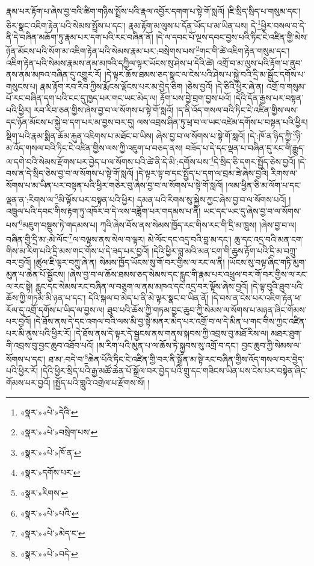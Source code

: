 རྣམ་པར་རྟོག་པ་ཞེས་བྱ་བའི་ཚིག་གཉིས་སྤྲོས་པའི་རྣལ་འབྱོར་དགག་པ་སྟེ་གོ་སླའོ། །ཇི་སྲིད་སྲིད་པ་གསུམ་དང་། ཅིར་སྣང་འཇིག་རྟེན་པའི་སེམས་སྤྲོས་པ་དང་། རྣམ་རྟོག་མ་ལུས་པ་དོན་ཡོད་པ་མ་ཡིན་པས། དེ་\footnote{«སྣར་»«པེ་»དེའི་}ཕྱིར་བསལ་བ་དེ་ནི་དེ་བཞིན་མཆོག་ཏུ་རྣམ་པར་དག་པའི་རང་བཞིན་ནོ། །དེ་ལ་དབང་པོ་ལྔས་དབང་བྱས་པའི་ཏིང་ངེ་འཛིན་གྱི་མེས་ཉོན་མོངས་པའི་སོག་མ་འཇིག་རྟེན་པའི་སེམས་རྣམ་པར་:བསྲེགས་པས་\footnote{«སྣར་»«པེ་»བསྲེག་པས་}གང་གི་ཚེ་འཇིག་རྟེན་གསུམ་དང་། འཇིག་རྟེན་པའི་སེམས་རྣམས་ནམ་མཁའི་དཀྱིལ་ལྟར་ཡོངས་སུ་ཤེས་པ་དེའི་ཚེ། འགྲོ་བ་མ་ལུས་པའི་རྟོག་པ་ནུབ་ནས་ནམ་མཁའ་བཞིན་དུ་འགྱུར་རོ། །དེ་ལྟར་ཆོས་ཐམས་ཅད་སྣང་ལ་ངེས་པའི་ཤེས་པ་སྐྱེ་བའི་དྲི་མ་སྦྱོང་དགོས་པ་གསུངས་པ། རྣམ་རྟོག་རབ་རིབ་ཀྱིས་རྨོངས་ལྡོངས་པར་མ་བྱེད་ཅིག །ཅེས་བྱའོ། །དེ་ཅིའི་ཕྱིར་ཞེ་ན། འགྲོ་བ་གསུམ་པོ་རང་བཞིན་དག་པའི་ངང་དུ་ཁྱད་པར་གང་ཡང་མེད་ལ། རྟོག་པས་བྱེ་བྲག་བྱས་པའོ། །དེའི་དོན་རྒྱས་པར་བསྟན་པའི་ཕྱིར། རབ་རིབ་ཅན་གྱིས་ཞེས་བྱ་བ་ལ་སོགས་པ་སྟེ་གོ་སླའོ། །ད་ནི་འོད་གསལ་བའི་ཏིང་ངེ་འཛིན་གྱིས་ལས་དང་ཉོན་མོངས་པ་སྐྱེ་བ་དག་པར་མ་བྱས་བར་དུ། ལས་འབྲས་ཤིན་ཏུ་ཕྲ་བ་ལ་ཡང་འཛེམ་དགོས་པ་བསྟན་པའི་ཕྱིར། སྡིག་པའི་རྣམ་སྨིན་ཆོམ་རྐུན་འཇིགས་པ་མཐོང་བ་ཡིས། ཞེས་བྱ་བ་ལ་སོགས་པ་སྟེ་གོ་སླའོ། །དེ་:ཁོ་ན་ཉིད་ཀྱི་\footnote{«སྣར་»«པེ་»ཁོ་ན་}ཉི་མ་འོད་གསལ་བའི་ཏིང་ངེ་འཛིན་གྱིས་ལས་ཀྱི་འཇུག་པ་བཅད་ནས། བཟོད་པ་དེ་དང་ལྡན་པ་བཞིན་དུ་རང་གི་རྒྱུད་ལ་དགེ་བའི་སེམས་རྫོགས་པར་བྱེད་པ་ལ་སོགས་པའི་ཚེ་ནི་དེ་མི་:དགོས་པས་\footnote{«སྣར་»དགོས་པར་}དེ་སྲིད་ཅི་དགར་སྤྱོད་ཅེས་བྱའོ། །དེ་བས་ན་དེ་སྲིད་ཅེས་བྱ་བ་ལ་སོགས་པ་སྟེ་གོ་སླའོ། །དེ་ལྟར་ལྟ་བ་དང་སྤྱོད་པ་དག་ལ་བྲམ་ཟེ་ཞེས་བྱའི། རིགས་ལ་སོགས་པ་མ་ཡིན་པར་བསྟན་པའི་ཕྱིར་གཅེར་བུ་ཞེས་བྱ་བ་ལ་སོགས་པ་སྟེ་གོ་སླའོ། །ལམ་ཕྱིན་ཅི་མ་ལོག་པ་དང་ལྡན་ན་:རིགས་ལ་\footnote{«སྣར་»རིགས་}མི་ལྟོས་པར་བསྟན་པའི་ཕྱིར། དམན་པའི་རིགས་སུ་སྐྱེས་ཀྱང་ཞེས་བྱ་བ་ལ་སོགས་པའོ། །འཁྲུལ་པའི་དབང་གིས་རྟག་ཏུ་འཁོར་བ་དེ་ལས་བཟློག་པར་གདམས་པ་ནི། ཡང་དང་ཡང་དུ་ཞེས་བྱ་བ་ལ་སོགས་པས་\footnote{«སྣར་»«པེ་»པའི་}མཇུག་བསྡུས་ཏེ་གདམས་པ། ཀྭའི་ཞེས་བོས་ནས་སེམས་ཁྱོད་རང་གིས་རང་གི་དྲི་མ་ཁྲུས། །ཞེས་བྱ་བ་ལ། བཞིན་གྱི་དྲི་མ་:མེ་ལོང་\footnote{«སྣར་»«པེ་»མེད་ང་}ལ་བལྟས་ནས་སེལ་བ་ལྟར། མེ་ལོང་དང་འདྲ་བའི་བླ་མ་དང་། ཆུ་དང་འདྲ་བའི་མན་ངག་གིས་མ་རིག་པའི་དྲི་མས་གང་གོས་པ་དེ་ཟད་པར་བྱའོ། །དེའི་ཕྱིར་བླ་མའི་མན་ངག་གི་ཆུས་རྟོག་པའི་དྲི་མ་བཀྲུ་བར་བྱའོ། །ཚུལ་ཇི་ལྟར་བཀྲུ་ཞེ་ན། སེམས་ཁྱོད་ཡོངས་སུ་གོ་བར་གྱིས་ལ་རང་ལ་ནི། །ཡོངས་སུ་བལྟ་ཞིང་གཏི་མུག་མུན་པ་ཆེན་པོ་སྦྱོངས། །ཞེས་བྱ་བ་ལ་ཆོས་ཐམས་ཅད་སེམས་དང་རླུང་གི་རྣམ་པར་འཕྲུལ་བར་གོ་བར་གྱིས་ལ་རང་ལ་རང་སྟེ། རླུང་དང་སེམས་རང་བཞིན་ལ་བཅུག་ལ་ནམ་མཁའ་དང་འདྲ་བར་ལྟོས་ཞེས་བྱའོ། །དེ་ལྟ་བུའི་ཐུབ་པའི་ཆོས་ཀྱི་གཏམ་མི་ཉན་པ་དང་། དེའི་སྐལ་བ་མེད་པ་ནི་མེ་ལྟར་སྣང་བ་ཡིན་ནོ། །དེ་བས་ན་ངེས་པར་འཇིག་རྟེན་ཕ་རོལ་དུ་འགྲོ་དགོས་པ་ཡིད་ལ་བྱས་ལ། ཐུབ་པའི་ཆོས་ཀྱི་གཏམ་བྱང་ཆུབ་ཀྱི་སེམས་ལ་སོགས་པ་མཉན་ཞིང་གོམས་པར་བྱའོ། །དེ་ཐོས་ནས་དེ་དང་འགལ་བའི་ལས་མི་བྱ་སྟེ་མནར་མེད་པར་འགྲོ་བ་ལ་དེ་མིན་པ་གང་གིས་ཀྱང་འཛིན་པར་མི་ནུས་པའི་ཕྱིར་རོ། །དེ་ཐོས་ནས་དེ་ལྟར་དེ་སྦྱངས་ནས་གནས་སྐབས་ཀྱི་འབྲས་བུ་མཐོ་རིས་ལ། མཐར་ཐུག་གི་འབྲས་བུ་བྱང་ཆུབ་འཐོབ་པའོ། །མ་རིག་པའི་མུན་པ་ལ་ཆོས་ཏེ་སྐྱབས་སུ་འགྲོ་བ་དང་། བྱང་ཆུབ་ཀྱི་སེམས་ལ་སོགས་པ་དང་། ཐ་མ་:བདེ་བ་\footnote{«སྣར་»«པེ་»བདེ་}ཆེན་པོའི་ཏིང་ངེ་འཛིན་གྱི་བར་ནི་སྒྲོན་མ་སྟེ་རང་བཞིན་གྱིས་འོད་གསལ་བར་བྱེད་པའི་ཕྱིར་རོ། །དེའི་ཕྱིར་སྲིད་པའི་རྒྱ་མཚོ་ཆེན་པོ་སྒྲོལ་བར་བྱེད་པའི་གྲུ་དང་གཟིངས་ཡིན་པས་ངེས་པར་བསྟེན་ཞིང་གོམས་པར་བྱའོ། །སྤྱོད་པའི་གླུའི་འགྲེལ་པ་རྫོགས་སོ། ། 